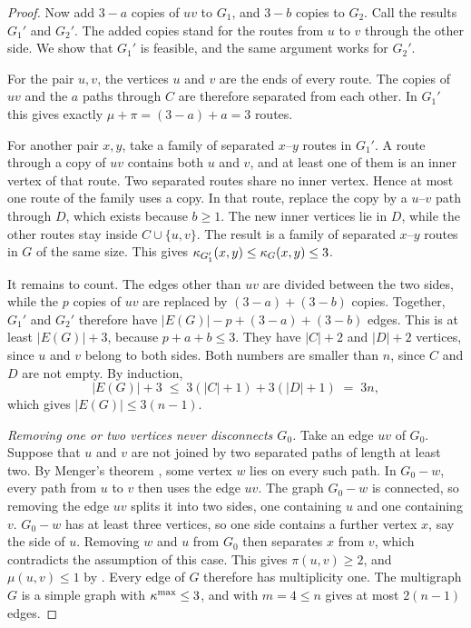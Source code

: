 \begin{proof}
Now add $3-a$ copies of $uv$ to $G_1$, and $3-b$ copies to $G_2$.
Call the results $G_1'$ and $G_2'$.
The added copies stand for the routes from $u$ to $v$ through the other side.
We show that $G_1'$ is feasible, and the same argument works for $G_2'$.

For the pair $u,v$, the vertices $u$ and $v$ are the ends of every route.
The copies of $uv$ and the $a$ paths through $C$ are therefore separated from each other.
In $G_1'$ this gives exactly $\mu+\pi=(3-a)+a=3$ routes.

For another pair $x,y$, take a family of separated $x$--$y$ routes in $G_1'$.
A route through a copy of $uv$ contains both $u$ and $v$, and at least one of them is an inner vertex of that route.
Two separated routes share no inner vertex.
Hence at most one route of the family uses a copy.
In that route, replace the copy by a $u$--$v$ path through $D$, which exists because $b\ge1$.
The new inner vertices lie in $D$, while the other routes stay inside $C\cup\{u,v\}$.
The result is a family of separated $x$--$y$ routes in $G$ of the same size.
This gives $\kappa_{G_1'}(x,y)\le\kappa_G(x,y)\le3$.

It remains to count.
The edges other than $uv$ are divided between the two sides, while the $p$ copies of $uv$ are replaced by $(3-a)+(3-b)$ copies.
Together, $G_1'$ and $G_2'$ therefore have $|E(G)|-p+(3-a)+(3-b)$ edges.
This is at least $|E(G)|+3$, because $p+a+b\le3$.
They have $|C|+2$ and $|D|+2$ vertices, since $u$ and $v$ belong to both sides.
Both numbers are smaller than $n$, since $C$ and $D$ are not empty.
By induction,
\[
    |E(G)|+3 \;\le\; 3(|C|+1)+3(|D|+1) \;=\; 3n,
\]
which gives $|E(G)|\le3(n-1)$.

\emph{Removing one or two vertices never disconnects $G_0$.}
Take an edge $uv$ of $G_0$.
Suppose that $u$ and $v$ are not joined by two separated paths of length at least two.
By Menger's theorem \cite[Corollary~3.3.5]{Diestel25}, some vertex $w$ lies on every such path.
In $G_0-w$, every path from $u$ to $v$ then uses the edge $uv$.
The graph $G_0-w$ is connected, so removing the edge $uv$ splits it into two sides, one containing $u$ and one containing $v$.
$G_0-w$ has at least three vertices, so one side contains a further vertex $x$, say the side of $u$.
Removing $w$ and $u$ from $G_0$ then separates $x$ from $v$, which contradicts the assumption of this case.
This gives $\pi(u,v)\ge2$, and $\mu(u,v)\le1$ by .
Every edge of $G$ therefore has multiplicity one.
The multigraph $G$ is a simple graph with $\kappa^{\max}\le3$, and  with $m=4\le n$ gives at most $2(n-1)$ edges.
\end{proof}

